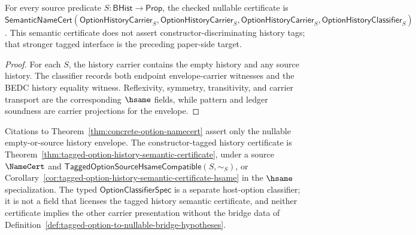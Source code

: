 \begin{theorem}
\label{thm:concrete-option-namecert}
For every source predicate $S:\mathsf{BHist}\to\mathsf{Prop}$, the checked nullable certificate is $\mathsf{SemanticNameCert}(\mathsf{OptionHistoryCarrier}_S,\mathsf{OptionHistoryCarrier}_S,\mathsf{OptionHistoryCarrier}_S,\mathsf{OptionHistoryClassifier}_S)$. This semantic certificate does not assert constructor-discriminating history tags; that stronger tagged interface is the preceding paper-side target.
\end{theorem}
\begin{proof}
For each $S$, the history carrier contains the empty history and any source history. The classifier records both endpoint envelope-carrier witnesses and the BEDC history equality witness. Reflexivity, symmetry, transitivity, and carrier transport are the corresponding $\hsame$ fields, while pattern and ledger soundness are carrier projections for the envelope.
\end{proof}

\begin{corollary}
\label{cor:option-certificate-scope}
Citations to Theorem~\ref{thm:concrete-option-namecert} assert only the
nullable empty-or-source history envelope. The constructor-tagged history
certificate is Theorem~\ref{thm:tagged-option-history-semantic-certificate},
under a source $\NameCert$ and
$\mathsf{TaggedOptionSourceHsameCompatible}(S,\sim_S)$, or
Corollary~\ref{cor:tagged-option-history-semantic-certificate-hsame} in the
$\hsame$ specialization. The typed $\mathsf{OptionClassifierSpec}$ is a
separate host-option classifier; it is not a field that licenses the tagged
history semantic certificate, and neither certificate implies the other carrier
presentation without the bridge data of
Definition~\ref{def:tagged-option-to-nullable-bridge-hypotheses}.
\end{corollary}
